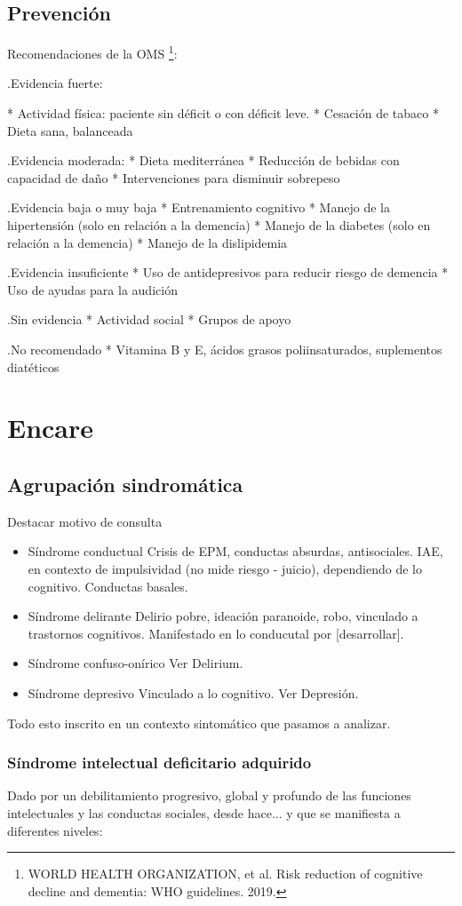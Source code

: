 \documentclass{scrbook}
\begin{document}
\subsection*{Prevención}
Recomendaciones de la OMS \footnote{WORLD HEALTH ORGANIZATION, et al. Risk reduction of cognitive decline and dementia: WHO guidelines. 2019.}:

.Evidencia fuerte:

* Actividad física: paciente sin déficit o con déficit leve.
* Cesación de tabaco
* Dieta sana, balanceada

.Evidencia moderada:
* Dieta mediterránea
* Reducción de bebidas con capacidad de daño
* Intervenciones para disminuir sobrepeso

.Evidencia baja o muy baja
* Entrenamiento cognitivo
* Manejo de la hipertensión (solo en relación a la demencia)
* Manejo de la diabetes (solo en relación a la demencia)
* Manejo de la dislipidemia

.Evidencia insuficiente
* Uso de antidepresivos para reducir riesgo de demencia
* Uso de ayudas para la audición

.Sin evidencia
* Actividad social
* Grupos de apoyo

.No recomendado
* Vitamina B y E, ácidos grasos poliinsaturados, suplementos diatéticos

\section*{Encare}
\subsection*{Agrupación sindromática}
Destacar motivo de consulta
\begin{itemize}
	\item{Síndrome conductual} Crisis de EPM, conductas absurdas, antisociales. IAE, en contexto de impulsividad (no mide riesgo - juicio), dependiendo de lo cognitivo. Conductas basales.
	\item{Síndrome delirante} Delirio pobre, ideación paranoide, robo, vinculado a trastornos cognitivos. Manifestado en lo conducutal por [desarrollar].
	\item{Síndrome confuso-onírico} Ver Delirium.
	\item {Síndrome depresivo} Vinculado a lo cognitivo. Ver Depresión.
\end{itemize}
Todo esto inscrito en un contexto sintomático que pasamos a analizar.
\subsubsection*{Síndrome intelectual deficitario adquirido}
Dado por un debilitamiento progresivo, global y profundo de las funciones intelectuales y las conductas sociales, desde hace... y que se manifiesta a diferentes niveles:
\end{document}
